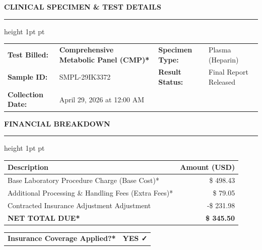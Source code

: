 \documentclass[10pt,letterpaper]{article}
\begin{document}
\vspace{0.5em}

{\fontsize{13pt}{16pt}\selectfont\bfseries\color{branddark} CLINICAL SPECIMEN \& TEST DETAILS}
\vspace{0.3em}
\hrule height 1pt pt\color{brandprimary}
\vspace{0.8em}

\begin{tabularx}{\textwidth}{@{}l X l X@{}}
    {\bfseries Test Billed:} & \textcolor{brandprimary}{\bfseries Comprehensive Metabolic Panel (CMP)*} & {\bfseries Specimen Type:} & Plasma (Heparin) \\
    {\bfseries Sample ID:} & SMPL-29IK3372 & {\bfseries Result Status:} & Final Report Released \\
    {\bfseries Collection Date:} & April 29, 2026 at 12:00 AM & & \\
\end{tabularx}

\vspace{2em}

{\fontsize{13pt}{16pt}\selectfont\bfseries\color{branddark} FINANCIAL BREAKDOWN}
\vspace{0.3em}
\hrule height 1pt pt\color{brandprimary}
\vspace{0.8em}

\renewcommand{\arraystretch}{1.3}
\begin{tabularx}{\textwidth}{@{}X r@{}}
    \rowcolor{bglight}
    {\bfseries Description} & {\bfseries Amount (USD)} \\
    \midrule
    Base Laboratory Procedure Charge (Base Cost)* & \$ 498.43 \\
    Additional Processing \& Handling Fees (Extra Fees)* & \$ 79.05 \\
    Contracted Insurance Adjustment Adjustment & -\$ 231.98 \\
    \midrule
    \rowcolor{branddark!5}
    {\fontsize{11pt}{13pt}\selectfont\bfseries\color{branddark} NET TOTAL DUE*} & {\fontsize{11pt}{13pt}\selectfont\bfseries\color{branddark} \$ 345.50} \\
    \bottomrule
\end{tabularx}
\renewcommand{\arraystretch}{1.0}

\vspace{1.5em}

\begin{tcolorbox}[colback=alertgreen!5, colframe=alertgreen, arc=2mm, boxrule=0.5pt, left=10pt, right=10pt, top=8pt, bottom=8pt]
    \begin{tabularx}{\textwidth}{@{}X r@{}}
        {\bfseries Insurance Coverage Applied?*} & \textcolor{alertgreen}{\bfseries YES ✓} \\
    \end{tabularx}
\end{tcolorbox}
\end{document}
